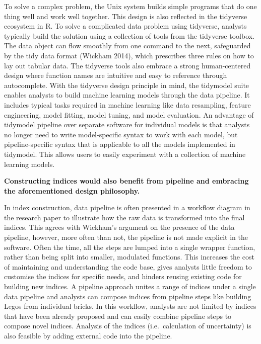 \documentclass[
]{article}
\begin{document}
To solve a complex problem, the Unix system builds simple programs that
do one thing well and work well together. This design is also reflected
in the tidyverse ecosystem in R. To solve a complicated data problem
using tidyverse, analysts typically build the solution using a
collection of tools from the tidyverse toolbox. The data object can flow
smoothly from one command to the next, safeguarded by the tidy data
format (Wickham 2014), which prescribes three rules on how to lay out
tabular data. The tidyverse tools also embrace a strong human-centered
design where function names are intuitive and easy to reference through
autocomplete. With the tidyverse design principle in mind, the tidymodel
suite enables analysts to build machine learning models through the data
pipeline. It includes typical tasks required in machine learning like
data resampling, feature engineering, model fitting, model tuning, and
model evaluation. An advantage of tidymodel pipeline over separate
software for individual models is that analysts no longer need to write
model-specific syntax to work with each model, but pipeline-specific
syntax that is applicable to all the models implemented in tidymodel.
This allows users to easily experiment with a collection of machine
learning models.

\textbf{Constructing indices would also benefit from pipeline and
embracing the aforementioned design philosophy.}

In index construction, data pipeline is often presented in a workflow
diagram in the research paper to illustrate how the raw data is
transformed into the final indices. This agrees with Wickham's argument
on the presence of the data pipeline, however, more often than not, the
pipeline is not made explicit in the software. Often the time, all the
steps are lumped into a single wrapper function, rather than being split
into smaller, modulated functions. This increases the cost of
maintaining and understanding the code base, gives analysts little
freedom to customise the indices for specific needs, and hinders reusing
existing code for building new indices. A pipeline approach unites a
range of indices under a single data pipeline and analysts can compose
indices from pipeline steps like building Legos from individual bricks.
In this workflow, analysts are not limited by indices that have been
already proposed and can easily combine pipeline steps to compose novel
indices. Analysis of the indices (i.e.~calculation of uncertainty) is
also feasible by adding external code into the pipeline.
\end{document}
